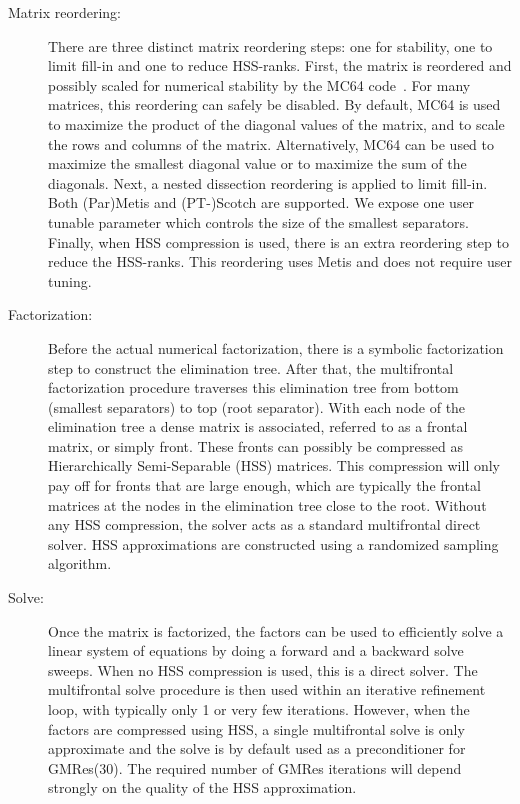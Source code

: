 \documentclass{article}
\begin{document}
\begin{description}
\item[Matrix reordering:] There are three distinct matrix reordering
  steps: one for stability, one to limit fill-in and one to reduce
  HSS-ranks. First, the matrix is reordered and possibly scaled for
  numerical stability by the MC64 code~\cite{duff1999design}. For many
  matrices, this reordering can safely be disabled. By default, MC64
  is used to maximize the product of the diagonal values of the
  matrix, and to scale the rows and columns of the
  matrix. Alternatively, MC64 can be used to maximize the smallest
  diagonal value or to maximize the sum of the diagonals. Next, a
  nested dissection reordering is applied to limit fill-in.  Both
  (Par)Metis and (PT-)Scotch are supported. We expose one user tunable
  parameter which controls the size of the smallest
  separators. Finally, when HSS compression is used, there is an extra
  reordering step to reduce the HSS-ranks. This reordering uses Metis
  and does not require user tuning.

\item[Factorization:] Before the actual numerical factorization, there
  is a symbolic factorization step to construct the elimination
  tree. After that, the multifrontal factorization procedure traverses
  this elimination tree from bottom (smallest separators) to top (root
  separator). With each node of the elimination tree a dense matrix is
  associated, referred to as a frontal matrix, or simply front. These
  fronts can possibly be compressed as Hierarchically Semi-Separable
  (HSS) matrices. This compression will only pay off for fronts that
  are large enough, which are typically the frontal matrices at the
  nodes in the elimination tree close to the root. Without any HSS
  compression, the solver acts as a standard multifrontal direct
  solver. HSS approximations are constructed using a randomized
  sampling algorithm.

\item[Solve:] Once the matrix is factorized, the factors can be used to
  efficiently solve a linear system of equations by doing a forward
  and a backward solve sweeps. When no HSS compression is used, this is
  a direct solver. The multifrontal solve procedure is then used
  within an iterative refinement loop, with typically only 1 or very
  few iterations. However, when the factors are compressed using HSS,
  a single multifrontal solve is only approximate and the solve is by
  default used as a preconditioner for GMRes($30$). The required
  number of GMRes iterations will depend strongly on the quality of
  the HSS approximation.
\end{description}
\end{document}

